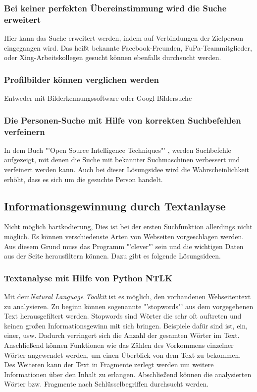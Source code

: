 		\subsubsection{Bei keiner perfekten Übereinstimmung wird die Suche erweitert}	Hier kann das Suche erweitert werden, indem auf Verbindungen der Zielperson eingegangen wird. Das heißt bekannte Facebook-Freunden, FuPa-Teammitglieder, oder Xing-Arbeitskollegen gesucht können ebenfalls durchsucht werden.
		\subsubsection{Profilbilder können verglichen werden}
		Entweder mit Bilderkennungssoftware oder Googl-Bildersuche
		\subsubsection{Die Personen-Suche mit Hilfe von korrekten Suchbefehlen verfeinern}	In dem Buch "'Open Source Intelligence Techniques"' \cite{Bazzell}, werden Suchbefehle aufgezeigt, mit denen die Suche mit bekannter Suchmaschinen verbessert und verfeinert werden kann. Auch bei dieser Lösungsidee wird die Wahrscheinlichkeit erhöht, dass es sich um die gesuchte Person handelt.
		
	\subsection{Informationsgewinnung durch Textanlayse}
	Nicht möglich hartkodierung, Dies ist bei der ersten Suchfunktion allerdings nicht möglich. Es können verschiedenste Arten von Webseiten vorgeschlagen werden. Aus diesem Grund muss das Programm "'clever"' sein und die wichtigen Daten aus der Seite herausfiltern können. Dazu gibt es folgende Lösungsideen.
		\subsubsection{Textanalyse mit Hilfe von Python NTLK}
		Mit dem\textit{Natural Language Toolkit} ist es möglich, den vorhandenen Webseitentext zu analysieren. Zu beginn können sogenannte "'stopwords"' aus dem vorgegebenen Text herausgefiltert werden. Stopwords sind Wörter die sehr oft auftreten und keinen großen Informationsgewinn mit sich bringen. Beispiele dafür sind ist, ein, einer, usw. Dadurch verringert sich die Anzahl der gesamten Wörter im Text. Anschließend können Funktionen wie das Zählen des Vorkommens einzelner Wörter angewendet werden, um einen Überblick von dem Text zu bekommen. Des Weiteren kann der Text in Fragmente zerlegt werden um weitere Informationen über den Inhalt zu erlangen. Abschließend können die analysierten Wörter bzw. Fragmente nach Schlüsselbegriffen durchsucht werden.
